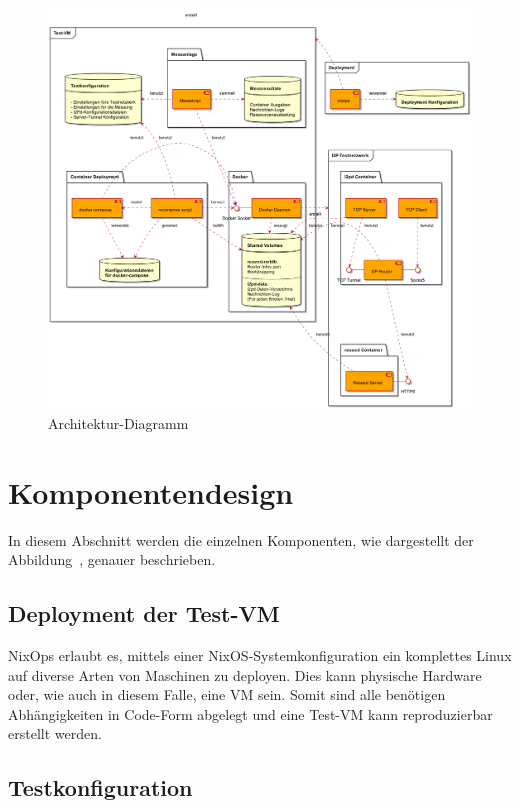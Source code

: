 \begin{figure}[htp]
  \includegraphics[width=1.1\textwidth]{include/uml/componentDiagram.png}
  \caption{Architektur-Diagramm}\label{fig:architektur-diagramm}
\end{figure}


\section{Komponentendesign}\label{sec:komponentendesign}

In diesem Abschnitt werden die einzelnen Komponenten, wie dargestellt der Abbildung~, genauer beschrieben.

\subsection{Deployment der Test-VM}

NixOps erlaubt es, mittels einer NixOS-Systemkonfiguration ein komplettes Linux auf diverse Arten von Maschinen zu deployen. Dies kann physische Hardware oder,
wie auch in diesem Falle, eine VM sein.
Somit sind alle benötigen Abhängigkeiten in Code-Form abgelegt und eine Test-VM kann reproduzierbar erstellt werden.

\subsection{Testkonfiguration}

